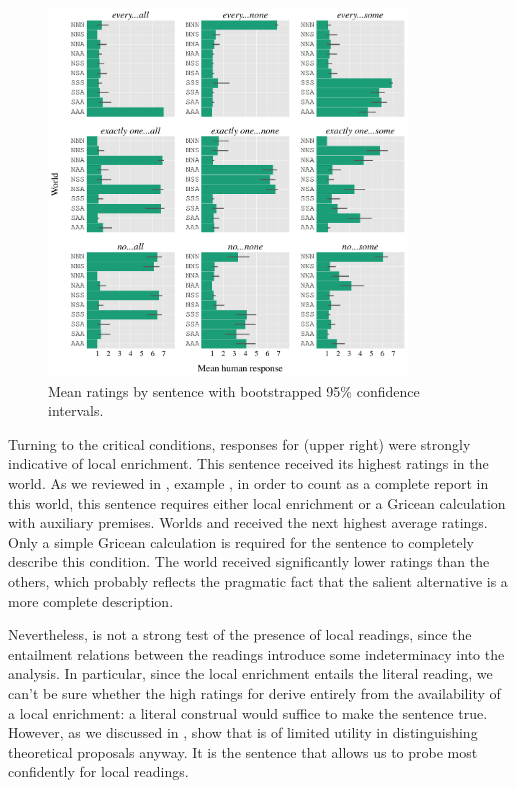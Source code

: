 \documentclass[leqno,12pt]{article}
\begin{document}
\begin{figure}[!ht]
  \centering
  \includegraphics[width=0.85\textwidth]{fig/basketball-pilot-2-11-14-results-parsed}
  \caption{Mean ratings by sentence with bootstrapped 95\% confidence intervals.}
  \label{fig:exp1-results}
\end{figure}


Turning to the critical conditions, responses for 
 (upper right) were
strongly indicative of local enrichment. This sentence received its
highest ratings in the  world. As we reviewed in
, example , in order to
count as a complete report in this world, this sentence requires
either local enrichment or a Gricean calculation with auxiliary
premises. Worlds  and  received the next highest
average ratings. Only a simple Gricean calculation is required for the
sentence to completely describe this condition. The
 world received significantly lower ratings than the
others, which probably reflects the pragmatic fact that the salient
alternative  is a more
complete description.

Nevertheless,  is not a strong test of the
presence of local readings, since the entailment relations between the readings
introduce some indeterminacy into the analysis. In particular, since
the local enrichment entails the literal reading, we can't be sure
whether the high ratings for  derive entirely from the
availability of a local enrichment: a literal construal would
suffice to make the sentence true. However, as we discussed in
, \citeauthor{Chemla:Spector:2011} show that
 is of limited utility in distinguishing
theoretical proposals anyway. It is the 
sentence that allows us to probe most confidently for local
readings. 
\end{document}
